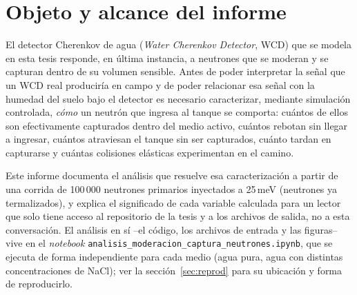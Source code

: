\documentclass[11pt,a4paper]{article}
\newcommand{\codigo}[1]{\nolinkurl{#1}}
\begin{document}
\begin{abstract}
Este informe documenta e interpreta, para un lector con acceso al repositorio de la tesis pero sin
conocimiento previo del análisis, el conjunto de variables físicas que se calculan a partir de las
simulaciones Monte Carlo (Geant4/MEIGA) del detector Cherenkov de agua (WCD) con agua pura y con
soluciones de NaCl, mediante el \textit{notebook} \codigo{analisis\_moderacion\_captura\_neutrones.ipynb}.
Se explica el significado físico y el propósito de cada variable --coeficiente de captura en el
medio, reflexión, transmisión, número de dispersiones elásticas $N$, letargía logarítmica $\xi$,
tiempo hasta la captura $\Delta t$ y su tiempo de decaimiento (\textit{die-away}) $\tau$, e
interacciones previas con el acero inoxidable, el Tyvek y el aire-- y se justifica por qué esta
caracterización es un paso necesario antes de poder emplear el WCD como un instrumento de campo
para estimar humedad del suelo mediante la técnica de sensado cósmico de neutrones
(CRNS). Se presentan resultados comparativos entre agua pura y agua con 2.5\,\% de NaCl como
ejemplo ilustrativo del método.
\end{abstract}

\tableofcontents

\section{Objeto y alcance del informe}

El detector Cherenkov de agua (\textit{Water Cherenkov Detector}, WCD) que se modela en esta tesis
responde, en última instancia, a neutrones que se moderan y se capturan dentro de su volumen
sensible. Antes de poder interpretar la señal que un WCD real produciría en campo y de poder
relacionar esa señal con la humedad del suelo bajo el detector es necesario
caracterizar, mediante simulación controlada, \emph{cómo} un neutrón que ingresa al tanque se
comporta: cuántos de ellos son efectivamente capturados dentro del medio activo, cuántos rebotan
sin llegar a ingresar, cuántos atraviesan el tanque sin ser capturados, cuánto tardan en capturarse
y cuántas colisiones elásticas experimentan en el camino.

Este informe documenta el análisis que resuelve esa caracterización a partir de una corrida de
100\,000 neutrones primarios inyectados a 25\,meV (neutrones ya termalizados), y explica el
significado de cada variable calculada para un lector que solo tiene acceso al repositorio de la
tesis y a los archivos de salida, no a esta conversación. El análisis en sí --el código, los
archivos de entrada y las figuras-- vive en el \textit{notebook}
\codigo{analisis\_moderacion\_captura\_neutrones.ipynb}, que se ejecuta de forma independiente para
cada medio (agua pura, agua con distintas concentraciones de NaCl); ver la sección~\ref{sec:reprod}
para su ubicación y forma de reproducirlo.
\end{document}
